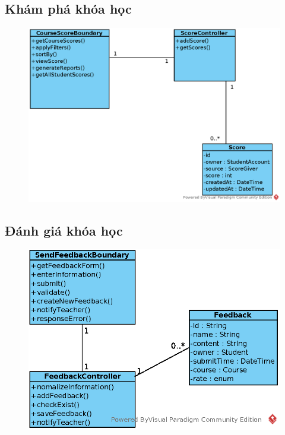 \documentclass[./../main_file.tex]{subfiles}
\begin{document}
	\subsection{Khám phá khóa học }
	\begin{figure}[H]
		\centering
		\includegraphics[width=\linewidth]{./images/VOPCs/3_9_check_course_progress.eps}
	\end{figure}
	
	\subsection{Đánh giá khóa học}
	\begin{figure}[H]
		\centering
		\includegraphics[width=\linewidth]{./images/VOPCs/3_10_feedbackcourse.eps}
	\end{figure}
	
\end{document}
